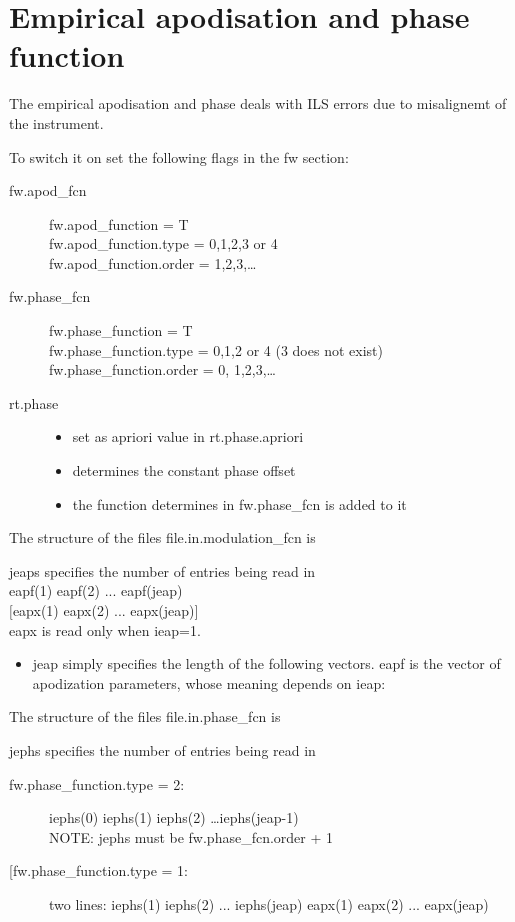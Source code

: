 \documentclass[a4paper]{article}
\begin{document}
\section{Empirical apodisation and phase function}


The empirical apodisation and phase deals with ILS errors due to
misalignemt of the instrument.

To switch it on set the following flags in the fw section:
\begin{description}
\item [fw.apod\_fcn] 
  fw.apod\_function = T\\
  fw.apod\_function.type = 0,1,2,3 or 4\\
  fw.apod\_function.order = 1,2,3,\ldots
\item [fw.phase\_fcn] 
  fw.phase\_function = T\\
  fw.phase\_function.type = 0,1,2 or 4 (3 does not exist)\\
  fw.phase\_function.order = 0, 1,2,3,\ldots\\
\item[rt.phase]
  \begin{itemize}
  \item set as apriori value in rt.phase.apriori
  \item determines the constant phase offset
  \item the function determines in fw.phase\_fcn is added to it
  \end{itemize}
\end{description}
 
The structure of the files file.in.modulation\_fcn is

\vspace{1cm}
jeaps specifies the number of entries being read in\\
eapf(1) eapf(2) ... eapf(jeap)\\
$[$eapx(1) eapx(2) ... eapx(jeap)$]$\\
\vspace{1cm}
eapx is read only when ieap=1.
\begin{itemize}
\item   jeap simply specifies the length of the following vectors. eapf is the
  vector of apodization parameters, whose meaning depends on ieap: 
\end{itemize}

The structure of the files file.in.phase\_fcn is

\vspace{1cm}
jephs specifies the number of entries being read in\\
\begin{description}
\item[fw.phase\_function.type = 2:] iephs(0) iephs(1) iephs(2) \ldots iephs(jeap-1)\\
  NOTE: jephs must be fw.phase\_fcn.order + 1
\item[[fw.phase\_function.type = 1:] two lines:
  iephs(1) iephs(2) ... iephs(jeap)
  eapx(1) eapx(2) ... eapx(jeap)\\
\end{description}
\end{document}
